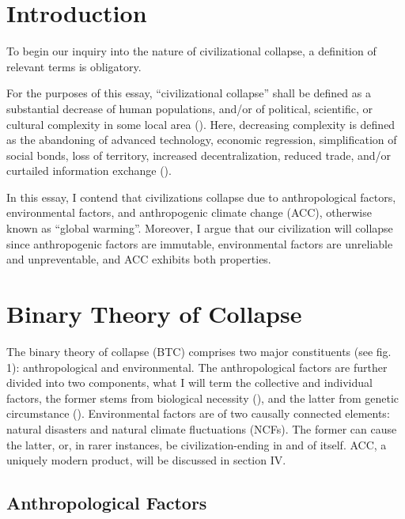\documentclass[12pt, a4paper, twoside]{article}
\begin{document}
\maketitle{}

\section{Introduction}

To begin our inquiry into the nature of civilizational collapse, a definition of relevant terms is obligatory. 

For the purposes of this essay, “civilizational collapse” shall be defined as a substantial decrease of human populations, and/or of political, scientific, or cultural complexity in some local area (\cite[p.\ 363]{diamond1994ecological}). Here, decreasing complexity is defined as the abandoning of advanced technology, economic regression, simplification of social bonds, loss of territory, increased decentralization, reduced trade, and/or curtailed information exchange (\cites[chap.\ 1]{tainter1988collapse}{tainter2023lecture}).

In this essay, I contend that civilizations collapse due to anthropological factors, environmental factors, and anthropogenic climate change (ACC), otherwise known as “global warming”. Moreover, I argue that our civilization will collapse since anthropogenic factors are immutable, environmental factors are unreliable and unpreventable, and ACC exhibits both properties. 

\section{Binary Theory of Collapse}

The binary theory of collapse (BTC) comprises two major constituents (see fig. 1): anthropological and environmental. The anthropological factors are further divided into two components, what I will term the collective and individual factors, the former stems from biological necessity (\cite[p.\ 13]{santos2015evolutionary}), and the latter from genetic circumstance (\cites[p.\ 8]{goriounova2019genes}[pp.\ 1–3]{wu2020genetic}). Environmental factors are of two causally connected elements: natural disasters and natural climate fluctuations (NCFs). The former can cause the latter, or, in rarer instances, be civilization-ending in and of itself. ACC, a uniquely modern product, will be discussed in section IV. 

\subsection{Anthropological Factors}
\end{document}
